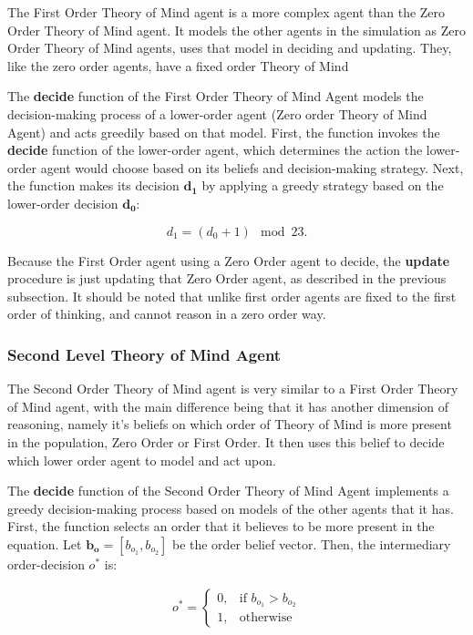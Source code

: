 The First Order Theory of Mind agent is a more complex agent than the Zero Order Theory of Mind agent. It models the other agents in the simulation as Zero Order Theory of Mind agents, uses that model in deciding and updating. They, like the zero order agents, have a fixed order Theory of Mind

The \textbf{decide} function of the First Order Theory of Mind Agent models the decision-making process of a lower-order agent (Zero order Theory of Mind Agent) and acts greedily based on that model. First, the function invokes the \textbf{decide} function of the lower-order agent, which determines the action the lower-order agent would choose based on its beliefs and decision-making strategy. Next, the function makes its decision $\mathbf{d_1}$ by applying a greedy strategy based on the lower-order decision \hyperref[eq:zero-order-decide]{$\mathbf{d_0}$}:

\[
d_1 = (d_0 + 1) \mod 23.
\]

Because the First Order agent using a Zero Order agent to decide, the \textbf{update} procedure is just updating that Zero Order agent, as described in the previous subsection. It should be noted that unlike \cite{veltman2019training} first order agents are fixed to the first order of thinking, and cannot reason in a zero order way.

\subsubsection{Second Level Theory of Mind Agent}

The Second Order Theory of Mind agent is very similar to a First Order Theory of Mind agent, with the main difference being that it has another dimension of reasoning, namely it's beliefs on which order of Theory of Mind is more present in the population, Zero Order or First Order. It then uses this belief to decide which lower order agent to model and act upon. 

The \textbf{decide} function of the Second Order Theory of Mind Agent implements a greedy decision-making process based on models of the other agents that it has. First, the function selects an order that it believes to be more present in the equation. Let $\mathbf{b_o} = [b_{o_{1}}, b_{o_{2}}]$ be the order belief vector. Then, the intermediary order-decision $o^*$ is:

\[
\begin{aligned}
\text{{$o^*$}} =
\begin{cases}
0, & \text{{if }} b_{o_{1}} > b_{o_{2}}\\
1, & \text{{otherwise}}
\end{cases}
\end{aligned}
\]

